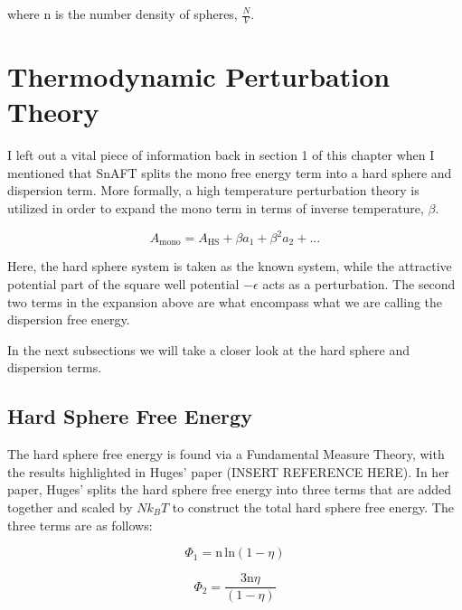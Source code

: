 where $\text{n}$ is the number density of spheres, $\frac{N}{V}$.












\section{Thermodynamic Perturbation Theory}

I left out a vital piece of information back in section 1 of this chapter when I mentioned that SnAFT splits the mono free energy term into a hard sphere and dispersion term.  More formally, a high temperature perturbation theory is utilized in order to expand the mono term in terms of inverse temperature, $\beta$. 

\begin{equation}
A_{\text{mono}} = A_{\text{HS}} + \beta a_1 + \beta^2 a_2 + ...
\end{equation}

Here, the hard sphere system is taken as the known system, while the attractive potential part of the square well potential $- \epsilon$ acts as a perturbation.  The second two terms in the expansion above are what encompass what we are calling the dispersion free energy.  

In the next subsections we will take a closer look at the hard sphere and dispersion terms.


\subsection{Hard Sphere Free Energy}

The hard sphere free energy is found via a Fundamental Measure Theory, with the results highlighted in Huges' paper (INSERT REFERENCE HERE).  In her paper, Huges' splits the hard sphere free energy into three terms that are added together and scaled by $N k_B T$ to construct the total hard sphere free energy.  The three terms are as follows:

\begin{equation}
\Phi_1 = \text{n} \, \text{ln} (1-\eta)
\end{equation} 

\begin{equation}
\Phi_2 = \frac{3 \text{n} \eta}{(1-\eta)}
\end{equation} 

